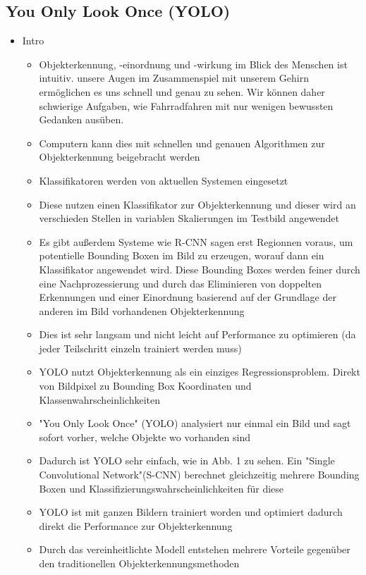 {	\subsection{You Only Look Once (YOLO)}
	\begin{itemize}
		\item Intro
		\begin{itemize}
			\item Objekterkennung, -einordnung und -wirkung im Blick des Menschen ist intuitiv. unsere Augen im Zusammenspiel mit unserem Gehirn ermöglichen es uns schnell und genau zu sehen. Wir können daher schwierige Aufgaben, wie Fahrradfahren mit nur wenigen bewussten Gedanken ausüben.
			\item Computern kann dies mit schnellen und genauen Algorithmen zur Objekterkennung beigebracht werden
			\item Klassifikatoren werden von aktuellen Systemen eingesetzt
			\item Diese nutzen einen Klassifikator zur Objekterkennung und dieser wird an verschieden Stellen in variablen Skalierungen im Testbild angewendet
			\item Es gibt außerdem Systeme wie R-CNN sagen erst Regionnen voraus, um potentielle Bounding Boxen im Bild zu erzeugen, worauf dann ein Klassifikator angewendet wird. Diese Bounding Boxes werden feiner durch eine Nachprozessierung und durch das Eliminieren von doppelten Erkennungen und einer Einordnung basierend auf der Grundlage der anderen im Bild vorhandenen Objekterkennung 
			\item Dies ist sehr langsam und nicht leicht auf Performance zu optimieren (da jeder Teilschritt einzeln trainiert werden muss)
			\item YOLO nutzt Objekterkennung als ein einziges Regressionsproblem. Direkt von Bildpixel zu Bounding Box Koordinaten und Klassenwahrscheinlichkeiten
			\item "You Only Look Once" (YOLO) analysiert nur einmal ein Bild und sagt sofort vorher, welche Objekte wo vorhanden sind
			\item Dadurch ist YOLO sehr einfach, wie in Abb. 1 zu sehen. Ein "Single Convolutional Network"(S-CNN) berechnet gleichzeitig mehrere Bounding Boxen und Klassifizierungswahrscheinlichkeiten für diese
			\item YOLO ist mit ganzen Bildern trainiert worden und optimiert dadurch direkt die Performance zur Objekterkennung
			\item Durch das vereinheitlichte Modell entstehen mehrere Vorteile gegenüber den traditionellen Objekterkennungsmethoden

\end{itemize}
\end{itemize}}
